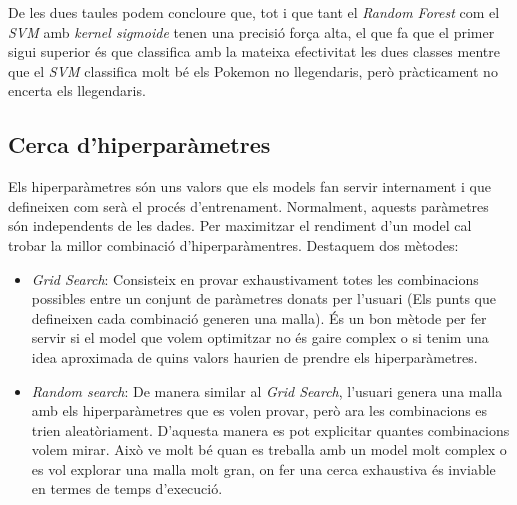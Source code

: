 \documentclass[a4paper, 11pt]{article}
\begin{document}
        De les dues taules podem concloure que, tot i que tant el \textit{Random Forest} com el \textit{SVM} amb \textit{kernel sigmoide} tenen una precisió força alta, el que fa que el primer sigui superior és que classifica amb la mateixa efectivitat les dues classes mentre que el \textit{SVM} classifica molt bé els Pokemon no llegendaris, però pràcticament no encerta els llegendaris.

        \subsection{Cerca d'hiperparàmetres}

        Els hiperparàmetres són uns valors que els models fan servir internament i que defineixen com serà el procés d'entrenament. Normalment, aquests paràmetres són independents de les dades. Per maximitzar el rendiment d'un model cal trobar la millor combinació d'hiperparàmentres. Destaquem dos mètodes:
        \begin{itemize}
            \item \textit{Grid Search}: Consisteix en provar exhaustivament totes les combinacions possibles entre un conjunt de paràmetres donats per l'usuari (Els punts que defineixen cada combinació generen una malla). És un bon mètode per fer servir si el model que volem optimitzar no és gaire complex o si tenim una idea aproximada de quins valors haurien de prendre els hiperparàmetres.

            \item \textit{Random search}: De manera similar al \textit{Grid Search}, l'usuari genera una malla amb els hiperparàmetres que es volen provar, però ara les combinacions es trien aleatòriament. D'aquesta manera es pot explicitar quantes combinacions volem mirar. Això ve molt bé quan es treballa amb un model molt complex o es vol explorar una malla molt gran, on fer una cerca exhaustiva és inviable en termes de temps d'execució.
        \end{itemize}
\end{document}
